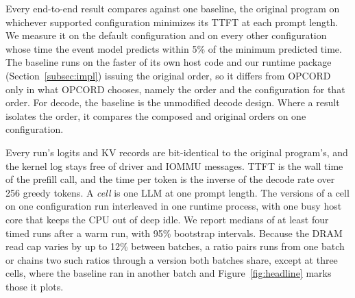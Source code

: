 Every end-to-end result compares against one baseline, the original program on whichever supported configuration minimizes its TTFT at each prompt length.
We measure it on the default configuration and on every other configuration whose time the event model predicts within 5\% of the minimum predicted time.
The baseline runs on the faster of its own host code and our runtime package (Section~\ref{subsec:impl}) issuing the original order, so it differs from OPCORD only in what OPCORD chooses, namely the order and the configuration for that order.
For decode, the baseline is the unmodified decode design.
Where a result isolates the order, it compares the composed and original orders on one configuration.

Every run's logits and KV records are bit-identical to the original program's, and the kernel log stays free of driver and IOMMU messages.
TTFT is the wall time of the prefill call, and the time per token is the inverse of the decode rate over 256 greedy tokens.
A \emph{cell} is one LLM at one prompt length.
The versions of a cell on one configuration run interleaved in one runtime process, with one busy host core that keeps the CPU out of deep idle.
We report medians of at least four timed runs after a warm run, with 95\% bootstrap intervals.
Because the DRAM read cap varies by up to 12\% between batches, a ratio pairs runs from one batch or chains two such ratios through a version both batches share, except at three cells, where the baseline ran in another batch and Figure~\ref{fig:headline} marks those it plots.


